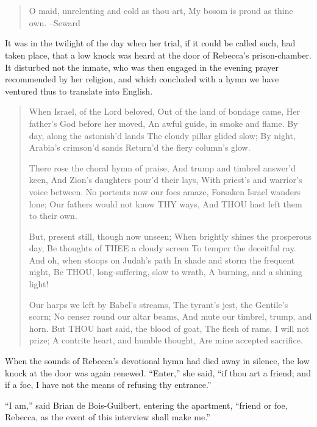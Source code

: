\chapter{}

\begin{quote}
O maid, unrelenting and cold as thou art,
My bosom is proud as thine own.
--Seward
\end{quote}

It was in the twilight of the day when her trial, if it could be called
such, had taken place, that a low knock was heard at the door of
Rebecca's prison-chamber. It disturbed not the inmate, who was then
engaged in the evening prayer recommended by her religion, and which
concluded with a hymn we have ventured thus to translate into English.

\begin{quote}
When Israel, of the Lord beloved,
Out of the land of bondage came,
Her father's God before her moved,
An awful guide, in smoke and flame.
By day, along the astonish'd lands
The cloudy pillar glided slow;
By night, Arabia's crimson'd sands
Return'd the fiery column's glow.

There rose the choral hymn of praise,
And trump and timbrel answer'd keen,
And Zion's daughters pour'd their lays,
With priest's and warrior's voice between.
No portents now our foes amaze,
Forsaken Israel wanders lone;
Our fathers would not know THY ways,
And THOU hast left them to their own.

But, present still, though now unseen;
When brightly shines the prosperous day,
Be thoughts of THEE a cloudy screen
To temper the deceitful ray.
And oh, when stoops on Judah's path
In shade and storm the frequent night,
Be THOU, long-suffering, slow to wrath,
A burning, and a shining light!

Our harps we left by Babel's streams,
The tyrant's jest, the Gentile's scorn;
No censer round our altar beams,
And mute our timbrel, trump, and horn.
But THOU hast said, the blood of goat,
The flesh of rams, I will not prize;
A contrite heart, and humble thought,
Are mine accepted sacrifice.
\end{quote}

When the sounds of Rebecca's devotional hymn had died away in silence,
the low knock at the door was again renewed. ``Enter,'' she said, ``if
thou art a friend; and if a foe, I have not the means of refusing thy
entrance.''

``I am,'' said Brian de Bois-Guilbert, entering the apartment, ``friend
or foe, Rebecca, as the event of this interview shall make me.''

